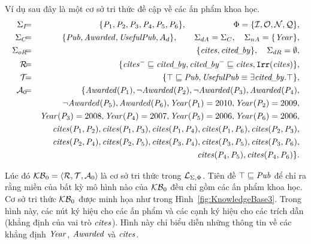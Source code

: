 \begin{Example}
	\label{ex:KnowledgeBase3}
	Ví dụ sau đây là một cơ sở tri thức đề cập về các ấn phẩm khoa học.
	\allowdisplaybreaks
	\begin{eqnarray*}
		\SigmaI \!\!\!&=&\!\!\! \{\Pub_1, \Pub_2, \Pub_3, \Pub_4, \Pub_5, \Pub_6\},\qquad\qquad\quad\;\,\, \Phi = \{\mI,\mO,\mN,\mQ\},\\[0.1ex]
		\SigmaC \!\!\!&=&\!\!\! \{\Publication, \Awarded, \UsefulPub, A_d\}, \qquad \SigmaDA = \SigmaC, \quad \SigmaNA = \{\PubYear\},\\[0.1ex]
		\SigmaOR \!\!\!&=&\!\!\! \{\Cites, \Citedby\}, \quad \SigmaDR = \emptyset,\\[0.1ex]
		\mR    \!\!\!&=&\!\!\! \{\Cites^- \sqsubseteq \Citedby, \Citedby^- \sqsubseteq \Cites, \Irr(\Cites) \}, \\[0.1ex]
		\mT    \!\!\!&=&\!\!\! \{\top \sqsubseteq \Publication, \UsefulPub \equiv \E \Citedby.\top\},\\[0.1ex]
		\mA_0 \!\!\!&=&\!\!\! \{\Awarded(\Pub_1), \neg\Awarded(\Pub_2), \neg\Awarded(\Pub_3), \Awarded(\Pub_4), \\[0.1ex]
		\!\!\!& & \neg\Awarded(\Pub_5), \Awarded(\Pub_6), 
		\PubYear(\Pub_1) = 2010, \PubYear(\Pub_2) = 2009, \\[0.1ex]
		\!\!\!& & \PubYear(\Pub_3) = 2008, \PubYear(\Pub_4) = 2007, 
		\PubYear(\Pub_5) = 2006, \PubYear(\Pub_6) = 2006, \\[0.1ex]
		\!\!\!& & \Cites(\Pub_1, \Pub_2), \Cites(\Pub_1, \Pub_3), \Cites(\Pub_1, \Pub_4), 
		\Cites(\Pub_1, \Pub_6), \Cites(\Pub_2, \Pub_3), \\[0.1ex]
		\!\!\!& & \Cites(\Pub_2, \Pub_4), \Cites(\Pub_2, \Pub_5), \Cites(\Pub_3, \Pub_4), \Cites(\Pub_3, \Pub_5), \Cites(\Pub_3, \Pub_6),\\[0.1ex]
		\!\!\!& & \Cites(\Pub_4, \Pub_5), \Cites(\Pub_4, \Pub_6)\}.
	\end{eqnarray*}
	
	Lúc đó $\mathcal{KB}_0 = \left\langle\mathcal{R},\mathcal{T},\mathcal{A}_0\right\rangle\!$ là cơ sở tri thức trong $\mathcal{L}_{\Sigma,\Phi}$. Tiên đề $\top \sqsubseteq \mathit{Pub}$ để chỉ ra rằng miền của bất kỳ mô hình nào của $\mathcal{KB}_0$ đều chỉ gồm các ấn phẩm khoa học.
	Cơ sở tri thức $\mathcal{KB}_0$ được minh họa như trong Hình~\ref{fig:KnowledgeBase3}. Trong hình này, các nút ký hiệu cho các ấn phẩm và các cạnh ký hiệu cho các trích dẫn (khẳng định của vai trò $\mathit{cites}$). Hình này chỉ biểu diễn những thông tin về các khẳng định $\mathit{Year}$, $\mathit{Awarded}$ và $\mathit{cites}$.\myend
\end{Example}

